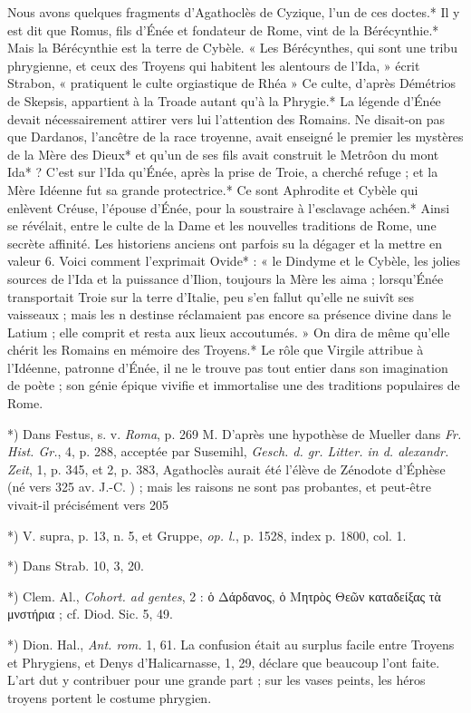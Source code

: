 \documentclass[a4paper, 11pt, oneside, polutonikogreek, french]{article}
\begin{document}
Nous avons quelques fragments d'Agathoclès de Cyzique, l'un de ces doctes.* Il y est dit que Romus, fils d'Énée et fondateur de Rome, vint de la Bérécynthie.* Mais la Bérécynthie est la terre de Cybèle. « Les Bérécynthes, qui sont une tribu phrygienne, et ceux des Troyens qui habitent les alentours de l'Ida, » écrit Strabon, « pratiquent le culte orgiastique de Rhéa » Ce culte, d'après Démétrios de Skepsis, appartient à la Troade autant qu'à la Phrygie.* La légende d'Énée devait nécessairement attirer vers lui l'attention des Romains. Ne disait-on pas que Dardanos, l'ancêtre de la race troyenne, avait enseigné le premier les mystères de la Mère des Dieux* et qu'un de ses fils avait construit le Metrôon du mont Ida* ? C'est sur l'Ida qu'Énée, après la prise de Troie, a cherché refuge ; et la Mère Idéenne fut sa grande protectrice.* Ce sont Aphrodite et Cybèle qui enlèvent Créuse, l'épouse d'Énée, pour la soustraire à l'esclavage achéen.* Ainsi se révélait, entre le culte de la Dame et les nouvelles traditions de Rome, une secrète affinité. Les historiens anciens ont parfois su la dégager et la mettre en valeur 6. Voici comment l'exprimait Ovide* : « le Dindyme et le Cybèle, les jolies sources de l'Ida et la puissance d'Ilion, toujours la Mère les aima ; lorsqu'Énée transportait Troie sur la terre d'Italie, peu s'en fallut qu'elle ne suivît ses vaisseaux ; mais les n destinse réclamaient pas encore sa présence divine dans le Latium ; elle comprit et resta aux lieux accoutumés. » On dira de même qu'elle chérit les Romains en mémoire des Troyens.* Le rôle que Virgile attribue à l'Idéenne, patronne d'Énée, il ne le trouve pas tout entier dans son imagination de poète ; son génie épique vivifie et immortalise une des traditions populaires de Rome.

*) Dans Festus, s. v. \emph{Roma}, p. 269 M. D'après une hypothèse de Mueller dans \emph{Fr. Hist. Gr.}, 4, p. 288, acceptée par Susemihl, \emph{Gesch. d. gr. Litter. in d. alexandr. Zeit}, 1, p. 345, et 2, p. 383, Agathoclès aurait été l'élève de Zénodote d'Éphèse (né vers 325 av. J.-C. ) ; mais les raisons ne sont pas probantes, et peut-être vivait-il précisément vers 205

*) V. supra, p. 13, n. 5, et Gruppe, \emph{op. l.}, p. 1528, index p. 1800, col. 1.

*) Dans Strab. 10, 3, 20.

*) Clem. Al., \emph{Cohort. ad gentes}, 2 : ὁ Δάρδανος, ὁ Μητρὸς Θεῶν καταδείξας τὰ μνστήρια ; cf. Diod. Sic. 5, 49.

*) Dion. Hal., \emph{Ant. rom.} 1, 61. La confusion était au surplus facile entre Troyens et Phrygiens, et Denys d'Halicarnasse, 1, 29, déclare que beaucoup l'ont faite. L'art dut y contribuer pour une grande part ; sur les vases peints, les héros troyens portent le costume phrygien.
\end{document}

